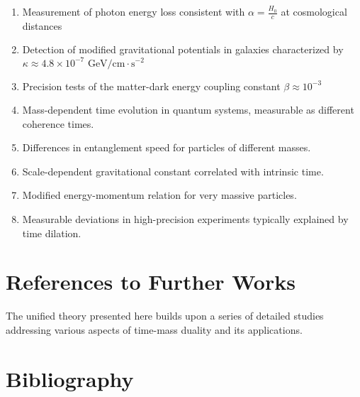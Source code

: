 \documentclass{article}
\begin{document}
	\begin{enumerate}
		\item Measurement of photon energy loss consistent with $\alpha = \frac{H_0}{c}$ at cosmological distances
		\item Detection of modified gravitational potentials in galaxies characterized by $\kappa \approx 4.8 \times 10^{-7} \text{ GeV/cm}\cdot\text{s}^{-2}$
		\item Precision tests of the matter-dark energy coupling constant $\beta \approx 10^{-3}$
		\item Mass-dependent time evolution in quantum systems, measurable as different coherence times.
		\item Differences in entanglement speed for particles of different masses.
		\item Scale-dependent gravitational constant correlated with intrinsic time.
		\item Modified energy-momentum relation for very massive particles.
		\item Measurable deviations in high-precision experiments typically explained by time dilation.
	\end{enumerate}
	
	\section{References to Further Works}
	
	The unified theory presented here builds upon a series of detailed studies addressing various aspects of time-mass duality and its applications.
	
	\section{Bibliography}
	
\end{document}
